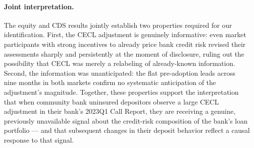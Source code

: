 \paragraph{Joint interpretation.}
The equity and CDS results jointly establish two properties required for our
identification.  First, the CECL adjustment is genuinely informative: even
market participants with strong incentives to already price bank credit risk
revised their assessments sharply and persistently at the moment of disclosure,
ruling out the possibility that CECL was merely a relabeling of already-known
information.  Second, the information was unanticipated: the flat pre-adoption
leads across nine months in both markets confirm no systematic anticipation of
the adjustment's magnitude.  Together, these properties support the
interpretation that when community bank uninsured depositors observe a large
CECL adjustment in their bank's 2023Q1 Call Report, they are receiving a
genuine, previously unavailable signal about the credit-risk composition of
the bank's loan portfolio --- and that subsequent changes in their deposit
behavior reflect a causal response to that signal.


